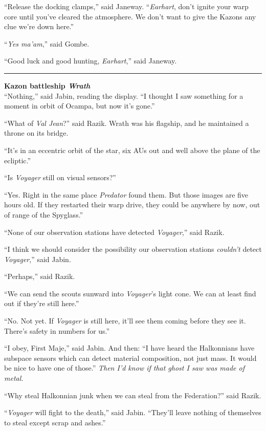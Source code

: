 \documentclass[twoside,letterpaper,12pt]{memoir}
\begin{document}
``Release the docking clamps,'' said Janeway. ``\textit{Earhart}, don't ignite your warp core until you've cleared the atmosphere. We don't want to give the Kazons any clue we're down here.''

``\textit{Yes ma'am},'' said Gombe.

``Good luck and good hunting, \textit{Earhart},'' said Janeway.

\fancybreak{\rule{3cm}{0.4 pt}}
\noindent\textbf{Kazon battleship \textit{Wrath}}\\

``Nothing,'' said Jabin, reading the display. ``I thought I saw something for a moment in orbit of Ocampa, but now it’s gone.''

``What of \textit{Val Jean}?'' said Razik. Wrath was his flagship, and he maintained a throne on its bridge.

``It's in an eccentric orbit of the star, six AUs out and well above the plane of the ecliptic.''

``Is \textit{Voyager} still on visual sensors?''

``Yes. Right in the same place \textit{Predator} found them. But those images are five hours old. If they restarted their warp drive, they could be anywhere by now, out of range of the Spyglass.''

``None of our observation stations have detected \textit{Voyager},'' said Razik.

``I think we should consider the possibility our observation stations \textit{couldn't} detect \textit{Voyager},'' said Jabin.

``Perhaps,'' said Razik.

``We can send the scouts sunward into \textit{Voyager}'s light cone. We can at least find out if they're still here.''

``No. Not yet. If \textit{Voyager} is still here, it'll see them coming before they see it. There's safety in numbers for us.''

``I obey, First Maje,'' said Jabin. And then: ``I have heard the Halkonnians have subspace sensors which can detect material composition, not just mass. It would be nice to have one of those.'' \textit{Then I’d know if that ghost I saw was made of metal.}

``Why steal Halkonnian junk when we can steal from the Federation?'' said Razik.

``\textit{Voyager} will fight to the death,'' said Jabin. ``They'll leave nothing of themselves to steal except scrap and ashes.''
\end{document}
